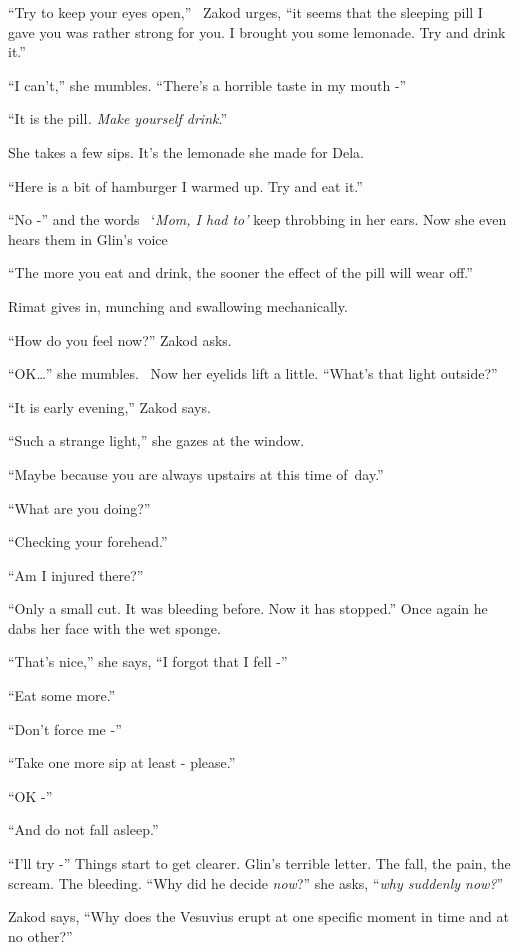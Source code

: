 \documentclass[twoside,11pt]{book}
\begin{document}
{}``Try to keep your eyes open,'' \ Zakod urges, ``it seems that the sleeping pill I gave you was rather strong for you.
I brought you some lemonade. Try and drink it.''

{}``I can't,'' she mumbles. ``There's a horrible taste in my mouth -''

{}``It is the pill\textit{. Make yourself drink}.''

She takes a few sips. It's the lemonade she made for Dela.

{}``Here is a bit of hamburger I warmed up. Try and eat it.''

{}``No -'' and the words \ {}`\textit{Mom, I had to'} keep throbbing in her ears. Now she even hears them in Glin's
voice

{}``The more you eat and drink, the sooner the effect of the pill will wear off.''

Rimat gives in, munching and swallowing mechanically.

{}``How do you feel now?'' Zakod asks.

{}``OK{\dots}'' she mumbles.~ Now her eyelids lift a little. ``What's that light outside?''

{}``It is early evening,'' Zakod says.

{}``Such a strange light,'' she gazes at the window.

{}``Maybe because you are always upstairs at this time of~day.''

{}``What are you doing?''

{}``Checking your forehead.''

{}``Am I injured there?''

{}``Only a small cut. It was bleeding before. Now it has stopped.'' Once again he dabs her face with the wet sponge.

{}``That's nice,'' she says, ``I forgot that I fell -''

{}``Eat some more.''

{}``Don't force me -''

{}``Take one more sip at least - please.''

{}``OK -''

{}``And do not fall asleep.''

{}``I'll try -'' Things start to get clearer. Glin's terrible letter. The fall, the pain, the scream. The bleeding.
``Why did he decide \textit{now}?'' she asks, ``\textit{why suddenly now?}{}''

Zakod says, ``Why does the Vesuvius erupt at one specific moment in time and at no other?''
\end{document}

